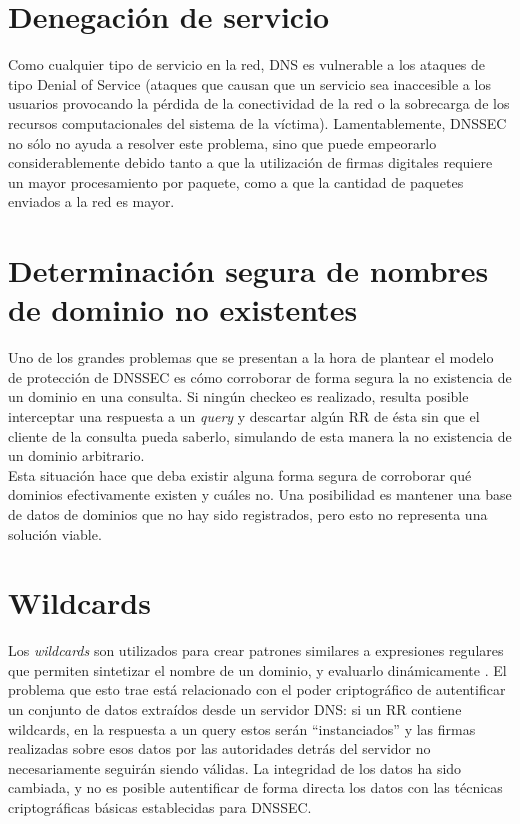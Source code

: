 \section{Denegaci\'on de servicio}
Como cualquier tipo de servicio en la red, DNS es vulnerable a los ataques de tipo Denial of Service (ataques que causan que un servicio sea inaccesible a los usuarios provocando la p\'erdida de la conectividad de la red o la sobrecarga de los recursos computacionales del sistema de la v\'ictima\cite{dos06}). Lamentablemente, DNSSEC no s\'olo no ayuda a resolver este problema, sino que puede empeorarlo considerablemente debido tanto a que la utilizaci\'on de firmas digitales requiere un mayor procesamiento por paquete, como a que la cantidad de paquetes enviados a la red es mayor.


\section{Determinaci\'on segura de nombres de dominio no existentes}

Uno de los grandes problemas que se presentan a la hora de plantear el modelo
de protecci\'on de DNSSEC es c\'omo corroborar de forma segura la no existencia de
un dominio en una consulta. Si ning\'un checkeo es realizado, resulta posible
interceptar una respuesta a un \textit{query} y descartar alg\'un RR de \'esta sin que
el cliente de la consulta pueda saberlo, simulando de esta manera la no existencia de un dominio arbitrario.\\
Esta situaci\'on hace que deba existir alguna forma segura de corroborar qu\'e dominios
efectivamente existen y cu\'ales no. Una posibilidad es mantener una base de
datos de dominios que no hay sido registrados, pero esto no representa una
soluci\'on viable.

\section{Wildcards}

Los \textit{wildcards} son utilizados para crear patrones similares a
expresiones regulares que permiten sintetizar el nombre de un dominio, y
evaluarlo din\'amicamente \cite{rfc1034}. El problema que esto trae est\'a
relacionado con el poder criptogr\'afico de autentificar un conjunto de datos
extra\'idos desde un servidor DNS: si un RR contiene wildcards, en la respuesta a
un query estos ser\'an ``instanciados'' y las firmas realizadas sobre esos datos
por las autoridades detr\'as del servidor no necesariamente seguir\'an siendo
v\'alidas. La integridad de los datos ha sido cambiada, y no es posible autentificar de forma
directa los datos con las t\'ecnicas criptogr\'aficas b\'asicas
establecidas para DNSSEC.
